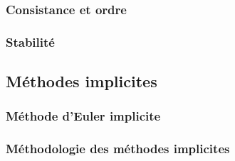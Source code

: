       \subsubsection{Consistance et ordre}
      \subsubsection{Stabilité}
    \subsection{Méthodes implicites}
      \subsubsection{Méthode d'Euler implicite}
      \subsubsection{Méthodologie des méthodes implicites}
